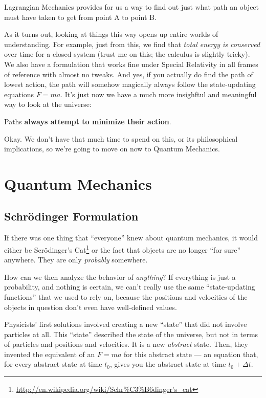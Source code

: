\documentclass[]{article}
\renewcommand{\href}[2]{#2\footnote{\url{#1}}}
\begin{document}
Lagrangian Mechanics provides for us a way to find out just what path an object
must have taken to get from point A to point B.

As it turns out, looking at things this way opens up entire worlds of
understanding. For example, just from this, we find that \emph{total energy is
conserved} over time for a closed system (trust me on this; the calculus is
slightly tricky). We also have a formulation that works fine under Special
Relativity in all frames of reference with almost no tweaks. And yes, if you
actually do find the path of lowest action, the path will somehow magically
always follow the state-updating equations \(F = m a\). It's just now we have a
much more insighftul and meaningful way to look at the universe:

Paths \textbf{always attempt to minimize their action}.

Okay. We don't have that much time to spend on this, or its philosophical
implications, so we're going to move on now to Quantum Mechanics.

\section{Quantum Mechanics}\label{quantum-mechanics}

\subsection{Schrödinger Formulation}\label{schruxf6dinger-formulation}

If there was one thing that ``everyone'' knew about quantum mechanics, it would
either be
\href{http://en.wikipedia.org/wiki/Schr\%C3\%B6dinger's_cat}{Scrödinger's Cat}
or the fact that objects are no longer ``for sure'' anywhere. They are only
\emph{probably} somewhere.

How can we then analyze the behavior of \emph{anything}? If everything is just a
probability, and nothing is certain, we can't really use the same
``state-updating functions'' that we used to rely on, because the positions and
velocities of the objects in question don't even have well-defined values.

Physicists' first solutions involved creating a new ``state'' that did not
involve particles at all. This ``state'' described the state of the universe,
but not in terms of particles and positions and velocities. It is a new
\emph{abstract} state. Then, they invented the equivalent of an \(F = m a\) for
this abstract state --- an equation that, for every abstract state at time
\(t_0\), gives you the abstract state at time \(t_0 + \Delta t\).
\end{document}
